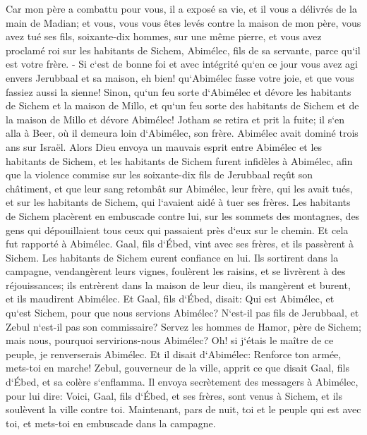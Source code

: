 \verse Car mon père a combattu pour vous, il a exposé sa vie, et il vous a délivrés de la main de Madian; 
\verse et vous, vous vous êtes levés contre la maison de mon père, vous avez tué ses fils, soixante-dix hommes, sur une même pierre, et vous avez proclamé roi sur les habitants de Sichem, Abimélec, fils de sa servante, parce qu`il est votre frère. - 
\verse Si c`est de bonne foi et avec intégrité qu`en ce jour vous avez agi envers Jerubbaal et sa maison, eh bien! qu`Abimélec fasse votre joie, et que vous fassiez aussi la sienne! 
\verse Sinon, qu`un feu sorte d`Abimélec et dévore les habitants de Sichem et la maison de Millo, et qu`un feu sorte des habitants de Sichem et de la maison de Millo et dévore Abimélec! 
\verse Jotham se retira et prit la fuite; il s`en alla à Beer, où il demeura loin d`Abimélec, son frère. 
\verse Abimélec avait dominé trois ans sur Israël. 
\verse Alors Dieu envoya un mauvais esprit entre Abimélec et les habitants de Sichem, et les habitants de Sichem furent infidèles à Abimélec, 
\verse afin que la violence commise sur les soixante-dix fils de Jerubbaal reçût son châtiment, et que leur sang retombât sur Abimélec, leur frère, qui les avait tués, et sur les habitants de Sichem, qui l`avaient aidé à tuer ses frères. 
\verse Les habitants de Sichem placèrent en embuscade contre lui, sur les sommets des montagnes, des gens qui dépouillaient tous ceux qui passaient près d`eux sur le chemin. Et cela fut rapporté à Abimélec. 
\verse Gaal, fils d`Ébed, vint avec ses frères, et ils passèrent à Sichem. Les habitants de Sichem eurent confiance en lui. 
\verse Ils sortirent dans la campagne, vendangèrent leurs vignes, foulèrent les raisins, et se livrèrent à des réjouissances; ils entrèrent dans la maison de leur dieu, ils mangèrent et burent, et ils maudirent Abimélec. 
\verse Et Gaal, fils d`Ébed, disait: Qui est Abimélec, et qu`est Sichem, pour que nous servions Abimélec? N`est-il pas fils de Jerubbaal, et Zebul n`est-il pas son commissaire? Servez les hommes de Hamor, père de Sichem; mais nous, pourquoi servirions-nous Abimélec? 
\verse Oh! si j`étais le maître de ce peuple, je renverserais Abimélec. Et il disait d`Abimélec: Renforce ton armée, mets-toi en marche! 
\verse Zebul, gouverneur de la ville, apprit ce que disait Gaal, fils d`Ébed, et sa colère s`enflamma. 
\verse Il envoya secrètement des messagers à Abimélec, pour lui dire: Voici, Gaal, fils d`Ébed, et ses frères, sont venus à Sichem, et ils soulèvent la ville contre toi. 
\verse Maintenant, pars de nuit, toi et le peuple qui est avec toi, et mets-toi en embuscade dans la campagne. 
